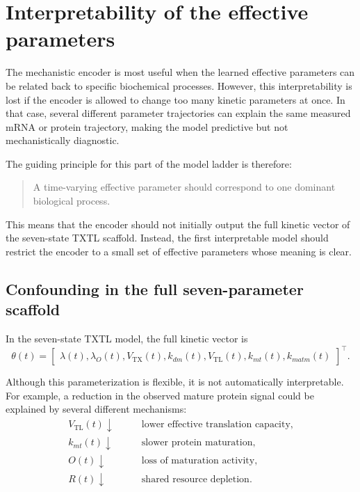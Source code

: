 \documentclass[11pt]{article}
\newcommand{\TX}{\mathrm{TX}}
\newcommand{\TL}{\mathrm{TL}}
\begin{document}
\section{Interpretability of the effective parameters}
\label{sec:interpretable_effective_parameters}

The mechanistic encoder is most useful when the learned effective parameters can be related back to specific biochemical processes. However, this interpretability is lost if the encoder is allowed to change too many kinetic parameters at once. In that case, several different parameter trajectories can explain the same measured mRNA or protein trajectory, making the model predictive but not mechanistically diagnostic.

The guiding principle for this part of the model ladder is therefore:
\begin{quote}
A time-varying effective parameter should correspond to one dominant biological process.
\end{quote}

This means that the encoder should not initially output the full kinetic vector of the seven-state TXTL scaffold. Instead, the first interpretable model should restrict the encoder to a small set of effective parameters whose meaning is clear.

\subsection{Confounding in the full seven-parameter scaffold}

In the seven-state TXTL model, the full kinetic vector is
\begin{equation}
    \theta(t)=
    \begin{bmatrix}
        \lambda(t),
        \lambda_O(t),
        V_{\TX}(t),
        k_{dm}(t),
        V_{\TL}(t),
        k_{mt}(t),
        k_{matm}(t)
    \end{bmatrix}^{\top}.
\end{equation}

Although this parameterization is flexible, it is not automatically interpretable. For example, a reduction in the observed mature protein signal could be explained by several different mechanisms:
\begin{align}
    V_{\TL}(t) \downarrow
    &\qquad \text{lower effective translation capacity}, \\
    k_{mt}(t) \downarrow
    &\qquad \text{slower protein maturation}, \\
    O(t) \downarrow
    &\qquad \text{loss of maturation activity}, \\
    R(t) \downarrow
    &\qquad \text{shared resource depletion}.
\end{align}
\end{document}
